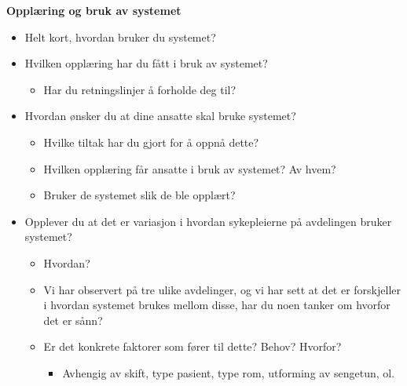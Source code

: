 \noindent
\textbf{Opplæring og bruk av systemet}
\begin{itemize}
	\item Helt kort, hvordan bruker du systemet?
	\item Hvilken opplæring har du fått i bruk av systemet?  
		\begin{itemize}
		\item Har du retningslinjer å forholde deg til?
	\end{itemize}
	\item Hvordan ønsker du at dine ansatte skal bruke systemet?
		\begin{itemize}
		\item Hvilke tiltak har du gjort for å oppnå dette?
		\item Hvilken opplæring får ansatte i bruk av systemet? Av hvem?
		\item Bruker de systemet slik de ble opplært?
	\end{itemize}
	\item Opplever du at det er variasjon i hvordan sykepleierne på avdelingen bruker systemet?
	\begin{itemize}
		\item Hvordan?
		\item Vi har observert på tre ulike avdelinger, og vi har sett at det er forskjeller i hvordan systemet brukes mellom disse, har du noen tanker om hvorfor det er sånn?
		\item Er det konkrete faktorer som fører til dette? Behov? Hvorfor?   	
		\begin{itemize}
			\item Avhengig av skift, type pasient, type rom, utforming av sengetun, ol.
		\end{itemize}		 
	\end{itemize}
\end{itemize}

